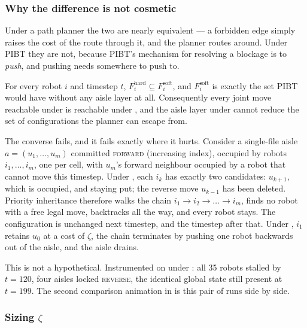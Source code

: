 \subsubsection{Why the difference is not cosmetic}

Under a path planner the two are nearly equivalent --- a forbidden edge simply
raises the cost of the route through it, and the planner routes around. Under
PIBT they are not, because PIBT's mechanism for resolving a blockage is to
\emph{push}, and pushing needs somewhere to push to.

\begin{proposition}
\label{prop:preservation}
For every robot $i$ and timestep $t$, $F^{\mathrm{hard}}_i \subseteq
F^{\mathrm{soft}}_i$, and $F^{\mathrm{soft}}_i$ is exactly the set PIBT would
have without any aisle layer at all. Consequently every joint move reachable
under  is reachable under , and the aisle layer
under  cannot reduce the set of configurations the planner can
escape from.
\end{proposition}

The converse fails, and it fails exactly where it hurts. Consider a
single-file aisle $a = (u_1, \dots, u_m)$ committed \textsc{forward}
(increasing index), occupied by robots $i_1, \dots, i_m$, one per cell, with
$u_m$'s forward neighbour occupied by a robot that cannot move this timestep.
Under , each $i_k$ has exactly two candidates: $u_{k+1}$, which
is occupied, and staying put; the reverse move $u_{k-1}$ has been deleted.
Priority inheritance therefore walks the chain $i_1 \to i_2 \to \dots \to i_m$,
finds no robot with a free legal move, backtracks all the way, and every robot
stays. The configuration is unchanged next timestep, and the timestep after
that. Under , $i_1$ retains $u_0$ at a cost of $\zeta$, the chain
terminates by pushing one robot backwards out of the aisle, and the aisle
drains.

This is not a hypothetical. Instrumented on 
under : all 35 robots stalled by $t = 120$, four aisles locked
\textsc{reverse}, the identical global state still present at $t = 199$. The
second comparison animation in  is this pair of runs side by
side.

\subsubsection{Sizing \texorpdfstring{$\zeta$}{zeta}}
\label{sec:contribution-zeta}

